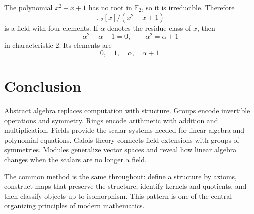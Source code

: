 \begin{example}
The polynomial $x^2+x+1$ has no root in $\mathbb{F}_2$, so it is irreducible. Therefore
\[
    \mathbb{F}_2[x]/(x^2+x+1)
\]
is a field with four elements. If $\alpha$ denotes the residue class of $x$, then
\[
    \alpha^2+\alpha+1=0,
    \qquad
    \alpha^2=\alpha+1
\]
in characteristic $2$. Its elements are
\[
    0,\quad1,\quad\alpha,\quad\alpha+1.
\]
\end{example}

\section{Conclusion}

Abstract algebra replaces computation with structure. Groups encode invertible operations and symmetry. Rings encode arithmetic with addition and multiplication. Fields provide the scalar systems needed for linear algebra and polynomial equations. Galois theory connects field extensions with groups of symmetries. Modules generalize vector spaces and reveal how linear algebra changes when the scalars are no longer a field.

The common method is the same throughout: define a structure by axioms, construct maps that preserve the structure, identify kernels and quotients, and then classify objects up to isomorphism. This pattern is one of the central organizing principles of modern mathematics.
